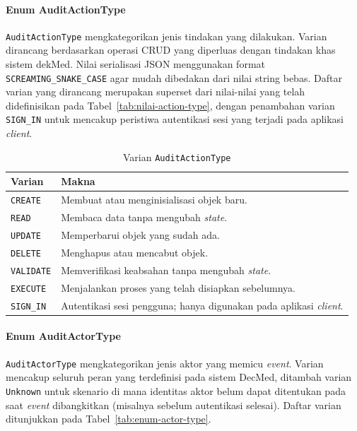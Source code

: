 \paragraph{Enum AuditActionType}

\texttt{AuditActionType} mengkategorikan jenis tindakan yang dilakukan. Varian
dirancang berdasarkan operasi CRUD yang diperluas dengan tindakan khas sistem
dekMed. Nilai serialisasi JSON menggunakan format \texttt{SCREAMING\_SNAKE\_CASE}
agar mudah dibedakan dari nilai string bebas. Daftar varian yang dirancang
merupakan superset dari nilai-nilai yang telah didefinisikan pada
Tabel~\ref{tab:nilai-action-type}, dengan penambahan varian \texttt{SIGN\_IN}
untuk mencakup peristiwa autentikasi sesi yang terjadi pada aplikasi
\textit{client}.

\begin{table}[htbp]
\centering
\caption{Varian \texttt{AuditActionType}}
\label{tab:enum-action-type}
\renewcommand{\arraystretch}{1.3}
\begin{tabular}{|p{3cm}|p{9cm}|}
\hline
\textbf{Varian} & \textbf{Makna} \\
\hline
\texttt{CREATE} & Membuat atau menginisialisasi objek baru. \\
\hline
\texttt{READ} & Membaca data tanpa mengubah \textit{state}. \\
\hline
\texttt{UPDATE} & Memperbarui objek yang sudah ada. \\
\hline
\texttt{DELETE} & Menghapus atau mencabut objek. \\
\hline
\texttt{VALIDATE} & Memverifikasi keabsahan tanpa mengubah \textit{state}. \\
\hline
\texttt{EXECUTE} & Menjalankan proses yang telah disiapkan sebelumnya. \\
\hline
\texttt{SIGN\_IN} & Autentikasi sesi pengguna; hanya digunakan pada aplikasi \textit{client}. \\
\hline
\end{tabular}
\end{table}

\paragraph{Enum AuditActorType}

\texttt{AuditActorType} mengkategorikan jenis aktor yang memicu \textit{event}.
Varian mencakup seluruh peran yang terdefinisi pada sistem DecMed, ditambah
varian \texttt{Unknown} untuk skenario di mana identitas aktor belum dapat
ditentukan pada saat \textit{event} dibangkitkan (misalnya sebelum autentikasi
selesai). Daftar varian ditunjukkan pada Tabel~\ref{tab:enum-actor-type}.

